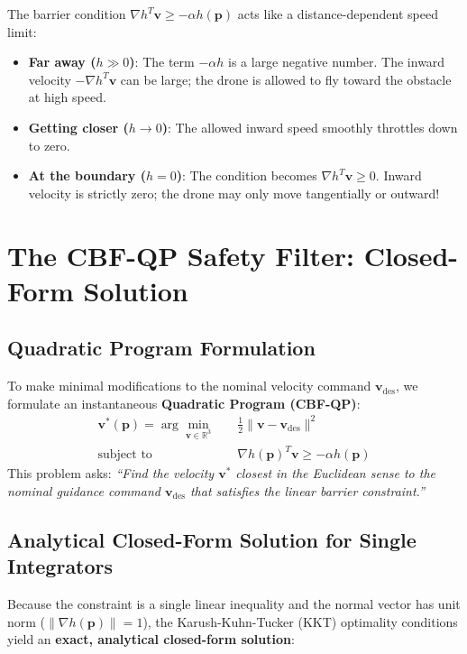 \documentclass[11pt,a4paper]{article}
\begin{document}
\begin{intuitionbox}
The barrier condition $\nabla h^T \mathbf{v} \ge -\alpha h(\mathbf{p})$ acts like a distance-dependent speed limit:
\begin{itemize}
    \item \textbf{Far away ($h \gg 0$)}: The term $-\alpha h$ is a large negative number. The inward velocity $-\nabla h^T \mathbf{v}$ can be large; the drone is allowed to fly toward the obstacle at high speed.
    \item \textbf{Getting closer ($h \to 0$)}: The allowed inward speed smoothly throttles down to zero.
    \item \textbf{At the boundary ($h = 0$)}: The condition becomes $\nabla h^T \mathbf{v} \ge 0$. Inward velocity is strictly zero; the drone may only move tangentially or outward!
\end{itemize}
\end{intuitionbox}

\section{The CBF-QP Safety Filter: Closed-Form Solution}

\subsection{Quadratic Program Formulation}
To make minimal modifications to the nominal velocity command $\mathbf{v}_{\mathrm{des}}$, we formulate an instantaneous \textbf{Quadratic Program (CBF-QP)}:
\begin{align}
\mathbf{v}^*(\mathbf{p}) = \arg\min_{\mathbf{v} \in \mathbb{R}^3} \quad & \frac{1}{2} \|\mathbf{v} - \mathbf{v}_{\mathrm{des}}\|^2 \label{eq:cbf_qp} \\
\text{subject to} \quad & \nabla h(\mathbf{p})^T \mathbf{v} \ge -\alpha h(\mathbf{p}) \nonumber
\end{align}
This problem asks: \textit{``Find the velocity $\mathbf{v}^*$ closest in the Euclidean sense to the nominal guidance command $\mathbf{v}_{\mathrm{des}}$ that satisfies the linear barrier constraint.''}

\subsection{Analytical Closed-Form Solution for Single Integrators}
Because the constraint is a single linear inequality and the normal vector has unit norm ($\|\nabla h(\mathbf{p})\| = 1$), the Karush-Kuhn-Tucker (KKT) optimality conditions yield an \textbf{exact, analytical closed-form solution}:
\end{document}
